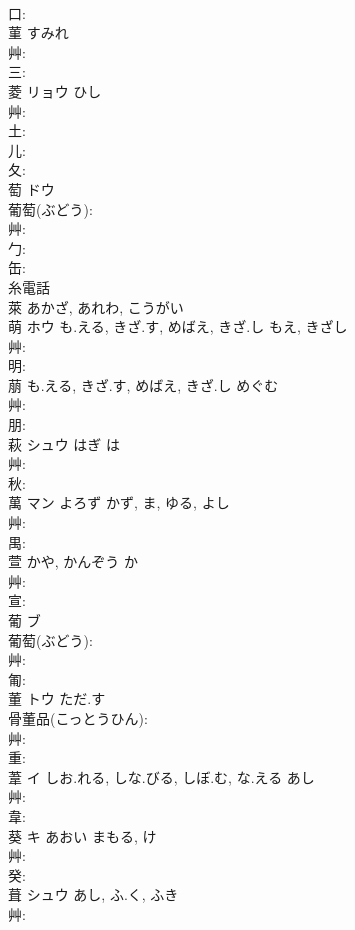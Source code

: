 \documentclass[8pt]{extreport}
\begin{document}
\begin{CJK}{UTF8}{min}
\\	口: 
\\	菫		すみれ				
\\	艸: 
\\	三: 
\\	菱	リョウ	ひし		
\\	艸: 
\\	土: 
\\	儿: 
\\	夂: 
\\	萄	ドウ			
\\	葡萄(ぶどう): 
\\	艸: 
\\	勹: 
\\	缶: 
\\	糸電話 
\\	萊		あかざ, あれわ, こうがい				
\\	萌	ホウ	も.える, きざ.す, めばえ, きざ.し	もえ, きざし	
\\	艸: 
\\	明: 
\\	萠		も.える, きざ.す, めばえ, きざ.し	めぐむ			
\\	艸: 
\\	朋: 
\\	萩	シュウ	はぎ	は	
\\	艸: 
\\	秋: 
\\	萬	マン	よろず	かず, ま, ゆる, よし	
\\	艸: 
\\	禺: 
\\	萱		かや, かんぞう	か			
\\	艸: 
\\	宣: 
\\	葡	ブ			
\\	葡萄(ぶどう): 
\\	艸: 
\\	匍: 
\\	董	トウ	ただ.す		
\\	骨董品(こっとうひん): 
\\	艸: 
\\	重: 
\\	葦	イ	しお.れる, しな.びる, しぼ.む, な.える	あし	
\\	艸: 
\\	韋: 
\\	葵	キ	あおい	まもる, け	
\\	艸: 
\\	癸: 
\\	葺	シュウ	あし, ふ.く, ふき		
\\	艸: 

\end{CJK}
\end{document}
